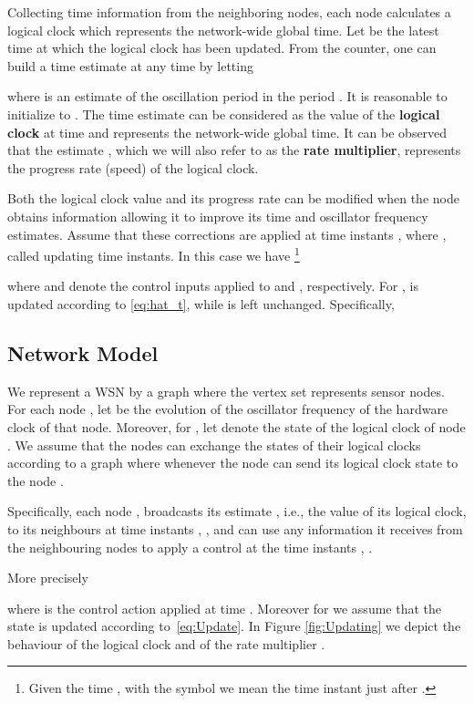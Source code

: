 \documentclass[english,a4paper,10pt,final]{article}
\numberwithin{equation}{section}
\numberwithin{figure}{section}
\begin{document}
Collecting time information from the neighboring nodes, each node calculates a logical clock which represents the network-wide global time. Let  be the latest time at which the logical clock has been updated. From the counter, one can build a time estimate  at any time  by letting

where  is an estimate of the oscillation period  in the period . It is reasonable to initialize  to . The time estimate  can be considered as the value of the \textbf{logical clock} at time  and represents the network-wide global time. It can be observed that the estimate  , which we will also refer to as the \textbf{rate multiplier}, represents the progress rate (speed) of the logical clock.

Both the logical clock value  and its progress rate  can be modified when the node obtains information allowing it to improve its time and oscillator frequency estimates. Assume that these corrections are applied at time instants , where , called updating time instants. In this case we have \footnote{Given the time , with the symbol  we mean the time instant just after .}

where  and  denote the control inputs applied to  and , respectively. For ,  is updated according to \eqref{eq:hat_t}, while  is left unchanged. Specifically,


\subsection{Network Model}

We represent a WSN  by a graph  where the vertex set  represents sensor nodes. For each node , let  be the evolution of the oscillator frequency of the hardware clock of that node. Moreover, for , let  denote the state of the logical clock of node . We assume that the nodes can exchange the states of their logical clocks according to a graph  where  whenever the node  can send its logical clock state to the node .  
 
Specifically, each node , broadcasts its estimate , i.e., the value of its logical clock, to its neighbours at time instants , , and can use any information it receives from the neighbouring nodes to apply a control at the time instants , .

More precisely

where  is the control action applied at time .
Moreover for  we assume that the state  is updated according to~\eqref{eq:Update}. In Figure \ref{fig:Updating} we depict the behaviour of the logical clock  and of the rate multiplier .
\end{document}
